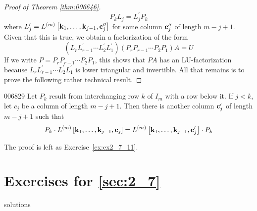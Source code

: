\begin{proof}[Proof of Theorem \ref{thm:006646}]
\begin{equation*}
P_{k}L_{j} = L_{j}^\prime P_{k}
\end{equation*}
where $L^\prime_{j} = L^{(m)} \left[ \textbf{k}_{1}, \dots, \textbf{k}_{j-1}, \textbf{c}^{\prime\prime}_{j} \right]$ for some column $\textbf{c}^{\prime\prime}_{j}$ of length $m - j + 1$. Given that this is true, we obtain a factorization of the form
\begin{equation*}
(L_{r}L_{r-1}^\prime \cdots L_{2}^\prime L_{1}^\prime)(P_{r}P_{r-1} \cdots P_{2}P_{1})A = U
\end{equation*}
If we write $P = P_{r}P_{r-1} \cdots P_{2}P_{1}$, this shows that $PA$ has an LU-factorization because $L_{r}L^\prime_{r-1} \cdots L^\prime_{2}L^\prime_{1}$ is lower triangular and invertible. All that remains is to prove the following rather technical result.
\end{proof}

\begin{lemma}{}{006829}
Let $P_{k}$ result from interchanging row $k$ of $I_{m}$ with a row below it. If $j < k$, let $c_{j}$ be a column of length $m - j + 1$. Then there is another column $\textbf{c}_{j}^\prime$ of length $m - j + 1$ such that
\begin{equation*}
P_{k} \cdot L^{(m)} \left[ \textbf{k}_{1}, \dots, \textbf{k}_{j-1}, \textbf{c}_{j} \right] = L^{(m)} \left[ \textbf{k}_{1}, \dots, \textbf{k}_{j-1}, \textbf{c}_{j}^\prime \right] \cdot P_{k}
\end{equation*}
\end{lemma}

\noindent The proof is left as Exercise~\ref{ex:ex2_7_11}. 

\section*{Exercises for \ref{sec:2_7}}

\begin{Filesave}{solutions}
\end{Filesave}

